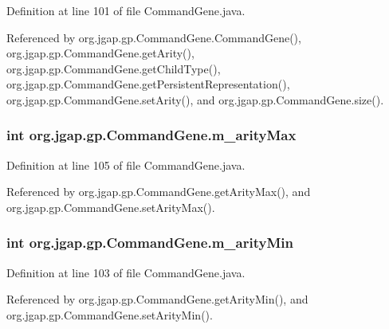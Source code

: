 Definition at line 101 of file Command\-Gene.\-java.



Referenced by org.\-jgap.\-gp.\-Command\-Gene.\-Command\-Gene(), org.\-jgap.\-gp.\-Command\-Gene.\-get\-Arity(), org.\-jgap.\-gp.\-Command\-Gene.\-get\-Child\-Type(), org.\-jgap.\-gp.\-Command\-Gene.\-get\-Persistent\-Representation(), org.\-jgap.\-gp.\-Command\-Gene.\-set\-Arity(), and org.\-jgap.\-gp.\-Command\-Gene.\-size().

\hypertarget{classorg_1_1jgap_1_1gp_1_1_command_gene_aa47dae1c5b5af003cfad3d3aaf1acfaa}{
\subsubsection[{m\-\_\-arity\-Max}]{\setlength{\rightskip}{0pt plus 5cm}int org.\-jgap.\-gp.\-Command\-Gene.\-m\-\_\-arity\-Max\hspace{0.3cm}{\ttfamily [private]}}}\label{classorg_1_1jgap_1_1gp_1_1_command_gene_aa47dae1c5b5af003cfad3d3aaf1acfaa}


Definition at line 105 of file Command\-Gene.\-java.



Referenced by org.\-jgap.\-gp.\-Command\-Gene.\-get\-Arity\-Max(), and org.\-jgap.\-gp.\-Command\-Gene.\-set\-Arity\-Max().

\hypertarget{classorg_1_1jgap_1_1gp_1_1_command_gene_a33531c47c9faca001b4fe1a82bd0d177}{
\subsubsection[{m\-\_\-arity\-Min}]{\setlength{\rightskip}{0pt plus 5cm}int org.\-jgap.\-gp.\-Command\-Gene.\-m\-\_\-arity\-Min\hspace{0.3cm}{\ttfamily [private]}}}\label{classorg_1_1jgap_1_1gp_1_1_command_gene_a33531c47c9faca001b4fe1a82bd0d177}


Definition at line 103 of file Command\-Gene.\-java.



Referenced by org.\-jgap.\-gp.\-Command\-Gene.\-get\-Arity\-Min(), and org.\-jgap.\-gp.\-Command\-Gene.\-set\-Arity\-Min().

